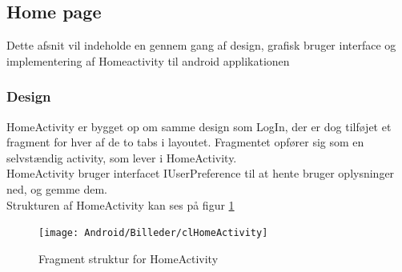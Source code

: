 	\pagebreak
	\subsection{Home page}
	Dette afsnit vil indeholde en gennem gang af design, grafisk bruger interface og implementering af Homeactivity til android applikationen
	\subsubsection{Design}
	HomeActivity er bygget op om samme design som LogIn, der er dog tilføjet et fragment for hver af de to tabs i layoutet. Fragmentet opfører sig som en selvstændig activity, som lever i HomeActivity. 
	\\HomeActivity bruger interfacet IUserPreference til at hente bruger oplysninger ned, og gemme dem.
	\\Strukturen af HomeActivity kan ses på figur \ref{fig:Klasse diagram for HomeActivity}
	\begin{figure}[h!]
		\begin{center}
			\texttt{[image: Android/Billeder/clHomeActivity]}
		\end{center}
		\caption{Fragment struktur for HomeActivity}
		\label{fig:Klasse diagram for HomeActivity}
	\end{figure}
	\pagebreak
	
